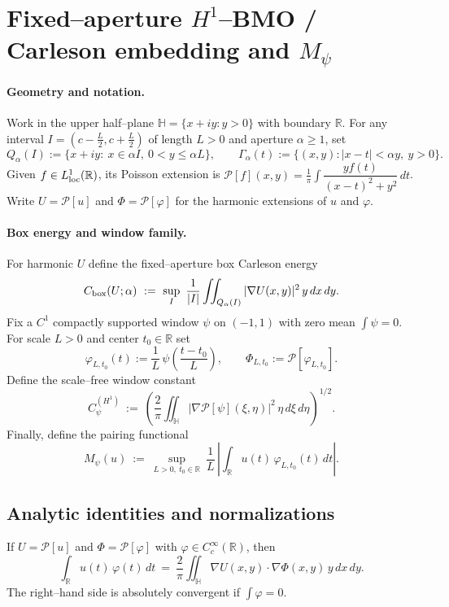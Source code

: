 
\section*{Fixed–aperture $H^1$–BMO / Carleson embedding and $M_\psi$}

\paragraph{Geometry and notation.}
Work in the upper half–plane $\mathbb{H}=\{x+iy:y>0\}$ with boundary $\mathbb{R}$. For any interval $I=(c-\tfrac{L}{2},c+\tfrac{L}{2})$ of length $L>0$ and aperture $\alpha\ge 1$, set
\[
Q_\alpha(I):=\{x+iy:\ x\in \alpha I,\ 0<y\le \alpha L\},\qquad
\Gamma_\alpha(t):=\{(x,y): |x-t|<\alpha y,\ y>0\}.
\]
Given $f\in L^1_{\rm loc}(\mathbb{R})$, its Poisson extension is $\mathcal{P}[f](x,y)=\tfrac{1}{\pi}\int \dfrac{y f(t)}{(x-t)^2+y^2}\,dt$. Write $U=\mathcal{P}[u]$ and $\Phi=\mathcal{P}[\varphi]$ for the harmonic extensions of $u$ and $\varphi$.

\paragraph{Box energy and window family.}
For harmonic $U$ define the fixed–aperture box Carleson energy
\[
C_{\rm box}(U;\alpha)\ :=\ \sup_{I}\ \frac{1}{|I|}\iint_{Q_\alpha(I)} |\nabla U(x,y)|^2\,y\,dx\,dy.
\]
Fix a $C^1$ compactly supported window $\psi$ on $(-1,1)$ with zero mean $\int\psi=0$. For scale $L>0$ and center $t_0\in\mathbb{R}$ set
\[
\varphi_{L,t_0}(t):=\frac{1}{L}\,\psi\!\left(\frac{t-t_0}{L}\right),\qquad
\Phi_{L,t_0}:=\mathcal{P}[\varphi_{L,t_0}].
\]
Define the scale–free window constant
\[
C_\psi^{(H^1)}\ :=\ \left(\frac{2}{\pi}\iint_{\mathbb{H}} |\nabla \mathcal{P}[\psi](\xi,\eta)|^2\,\eta\,d\xi\,d\eta\right)^{1/2}.
\]
Finally, define the pairing functional
\[
M_\psi(u)\ :=\ \sup_{L>0,\ t_0\in\mathbb{R}}\ \frac{1}{L}\,\left|\int_{\mathbb{R}} u(t)\,\varphi_{L,t_0}(t)\,dt\right|.
\]

\subsection*{Analytic identities and normalizations}

\begin{lemma}\label{lem:green-embedding}
If $U=\mathcal{P}[u]$ and $\Phi=\mathcal{P}[\varphi]$ with $\varphi\in C_c^\infty(\mathbb{R})$, then
\[
\int_{\mathbb{R}} u(t)\,\varphi(t)\,dt\ =\ \frac{2}{\pi}\iint_{\mathbb{H}} \nabla U(x,y)\cdot \nabla \Phi(x,y)\,y\,dx\,dy.
\]
The right–hand side is absolutely convergent if $\int \varphi=0$.
\end{lemma}

